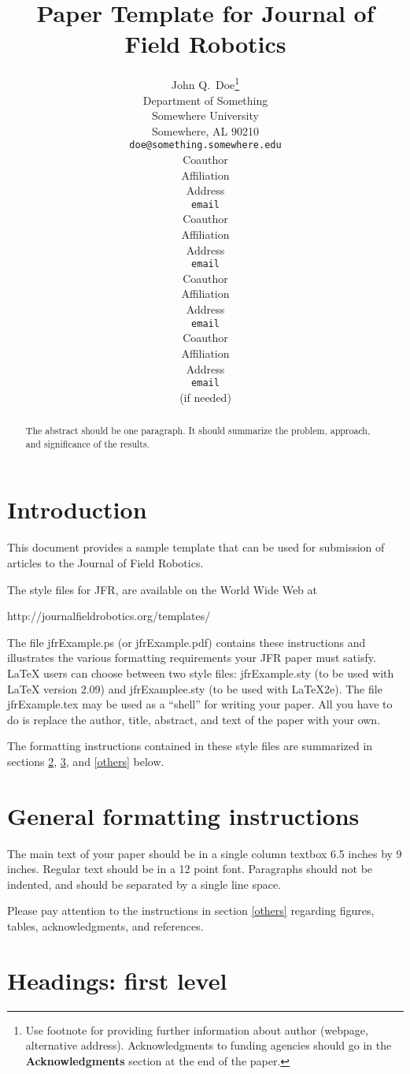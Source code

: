 \documentclass{article}
\title{Paper Template for Journal of Field Robotics}
\author{
John Q.~Doe\thanks{ Use footnote for providing further information
about author (webpage, alternative address). Acknowledgments to
funding agencies should go in the \textbf{Acknowledgments} section
at the end of the paper.} \\
Department of Something\\
Somewhere University\\
Somewhere, AL 90210 \\
\texttt{doe@something.somewhere.edu} \\
\And
Coauthor \\
Affiliation \\
Address \\
\texttt{email} \\
\AND
Coauthor \\
Affiliation \\
Address \\
\texttt{email} \\
\And
Coauthor \\
Affiliation \\
Address \\
\texttt{email} \\
\And
Coauthor \\
Affiliation \\
Address \\
\texttt{email} \\
(if needed)\\
}
\begin{document}
\maketitle

\begin{abstract}
The abstract should be one paragraph. It should summarize the
problem, approach, and significance of the results.
\end{abstract}

\section{Introduction}

This document provides a sample template that can be used for
submission of articles to the Journal of Field Robotics.

The style files for JFR, are available on the World Wide Web at
\begin{center}
   http://journalfieldrobotics.org/templates/
\end{center}
The file jfrExample.ps (or jfrExample.pdf) contains these
instructions and illustrates the various formatting requirements
your JFR paper must satisfy. \LaTeX{} users can choose between two
style files: jfrExample.sty (to be used with \LaTeX{} version 2.09)
and jfrExamplee.sty (to be used with \LaTeX{}2e). The file
jfrExample.tex may be used as a ``shell'' for writing your paper.
All you have to do is replace the author, title, abstract, and text
of the paper with your own.

The formatting instructions contained in these style files are summarized in
sections \ref{gen_inst}, \ref{headings}, and \ref{others} below.

\section{General formatting instructions}
\label{gen_inst}

The main text of your paper should be in a single column textbox 6.5
inches by 9 inches. Regular text should be in a 12 point font.
Paragraphs should not be indented, and should be separated by a
single line space.

Please pay attention to the instructions in section \ref{others}
regarding figures, tables, acknowledgments, and references.

\section{Headings: first level}
\label{headings}
\end{document}
